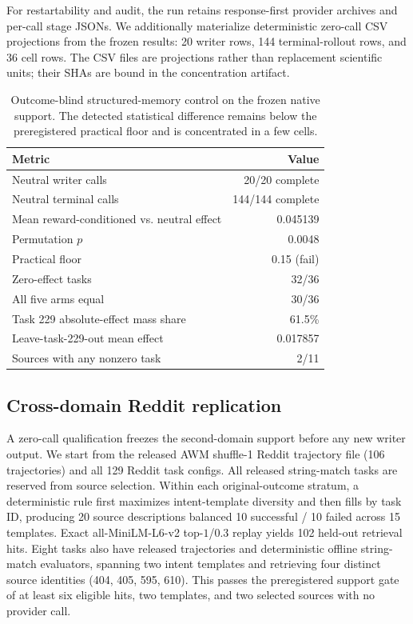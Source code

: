 For restartability and audit, the run retains response-first provider archives and per-call stage JSONs. We additionally materialize deterministic zero-call CSV projections from the frozen results: 20 writer rows, 144 terminal-rollout rows, and 36 cell rows. The CSV files are projections rather than replacement scientific units; their SHAs are bound in the concentration artifact.

\begin{table}[h]
\centering
\small
\caption{Outcome-blind structured-memory control on the frozen native support. The detected statistical difference remains below the preregistered practical floor and is concentrated in a few cells.}
\label{tab:b11-neutral}
\begin{tabular}{lr}
\toprule
Metric & Value \\
\midrule
Neutral writer calls & 20/20 complete \\
Neutral terminal calls & 144/144 complete \\
Mean reward-conditioned vs. neutral effect & 0.045139 \\
Permutation $p$ & 0.0048 \\
Practical floor & 0.15 (fail) \\
Zero-effect tasks & 32/36 \\
All five arms equal & 30/36 \\
Task 229 absolute-effect mass share & 61.5\% \\
Leave-task-229-out mean effect & 0.017857 \\
Sources with any nonzero task & 2/11 \\
\bottomrule
\end{tabular}
\end{table}

\subsection{Cross-domain Reddit replication}
A zero-call qualification freezes the second-domain support before any new writer output. We start from the released AWM shuffle-1 Reddit trajectory file (106 trajectories) and all 129 Reddit task configs. All released string-match tasks are reserved from source selection. Within each original-outcome stratum, a deterministic rule first maximizes intent-template diversity and then fills by task ID, producing 20 source descriptions balanced 10 successful / 10 failed across 15 templates. Exact all-MiniLM-L6-v2 top-$1$/0.3 replay yields 102 held-out retrieval hits. Eight tasks also have released trajectories and deterministic offline string-match evaluators, spanning two intent templates and retrieving four distinct source identities (404, 405, 595, 610). This passes the preregistered support gate of at least six eligible hits, two templates, and two selected sources with no provider call.


